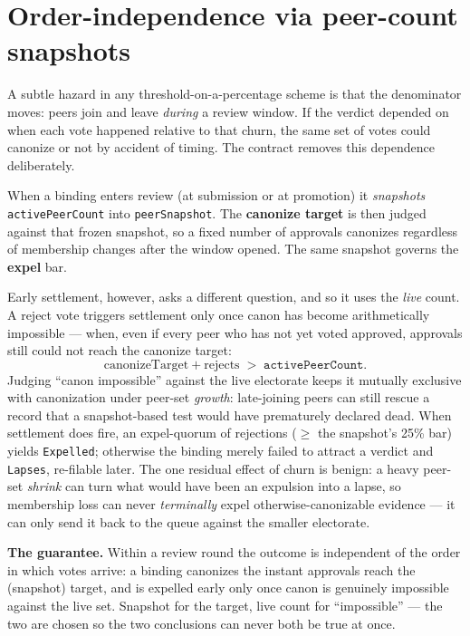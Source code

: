 \documentclass[11pt,a4paper]{article}
\begin{document}
\section{Order-independence via peer-count snapshots}

A subtle hazard in any threshold-on-a-percentage scheme is that the
denominator moves: peers join and leave \emph{during} a review window. If the
verdict depended on when each vote happened relative to that churn, the same
set of votes could canonize or not by accident of timing. The contract
removes this dependence deliberately.

When a binding enters review (at submission or at promotion) it
\emph{snapshots} \texttt{activePeerCount} into \texttt{peerSnapshot}. The
\textbf{canonize target} is then judged against that frozen snapshot, so a
fixed number of approvals canonizes regardless of membership changes after
the window opened. The same snapshot governs the \textbf{expel} bar.

Early settlement, however, asks a different question, and so it uses the
\emph{live} count. A reject vote triggers settlement only once canon has
become arithmetically impossible --- when, even if every peer who has not yet
voted approved, approvals still could not reach the canonize target:
\[
  \text{canonizeTarget} + \text{rejects} \;>\; \texttt{activePeerCount}.
\]
Judging ``canon impossible'' against the live electorate keeps it mutually
exclusive with canonization under peer-set \emph{growth}: late-joining peers
can still rescue a record that a snapshot-based test would have prematurely
declared dead. When settlement does fire, an expel-quorum of rejections
($\geq$ the snapshot's 25\% bar) yields \texttt{Expelled}; otherwise the
binding merely failed to attract a verdict and \texttt{Lapses}, re-filable
later. The one residual effect of churn is benign: a heavy peer-set
\emph{shrink} can turn what would have been an expulsion into a lapse, so
membership loss can never \emph{terminally} expel otherwise-canonizable
evidence --- it can only send it back to the queue against the smaller
electorate.

\begin{notebox}
\textbf{The guarantee.} Within a review round the outcome is independent of
the order in which votes arrive: a binding canonizes the instant approvals
reach the (snapshot) target, and is expelled early only once canon is
genuinely impossible against the live set. Snapshot for the target, live
count for ``impossible'' --- the two are chosen so the two conclusions can
never both be true at once.
\end{notebox}
\end{document}
